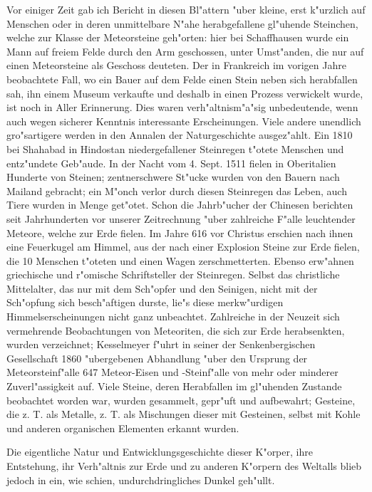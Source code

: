 \documentclass[a4paper, 11pt, oneside]{article}
\begin{document}
Vor einiger Zeit gab ich Bericht in diesen Bl"attern "uber kleine, erst k"urzlich auf Menschen oder in deren unmittelbare N"ahe herabgefallene gl"uhende Steinchen, welche zur Klasse der Meteorsteine geh"orten: hier bei Schaffhausen wurde ein Mann auf freiem Felde durch den Arm geschossen, unter Umst"anden, die nur auf einen Meteorsteine als Geschoss deuteten. Der in Frankreich im vorigen Jahre beobachtete Fall, wo ein Bauer auf dem Felde einen Stein neben sich herabfallen sah, ihn einem Museum verkaufte und deshalb in einen Prozess verwickelt wurde, ist noch in Aller Erinnerung. Dies waren verh"altnism"a"sig unbedeutende, wenn auch wegen sicherer Kenntnis interessante Erscheinungen. Viele andere unendlich gro"sartigere werden in den Annalen der Naturgeschichte ausgez"ahlt. Ein 1810 bei Shahabad in Hindostan niedergefallener Steinregen t"otete Menschen und entz"undete Geb"aude. In der Nacht vom 4. Sept. 1511 fielen in Oberitalien Hunderte von Steinen; zentnerschwere St"ucke wurden von den Bauern nach Mailand gebracht; ein M"onch verlor durch diesen Steinregen das Leben, auch Tiere wurden in Menge get"otet. Schon die Jahrb"ucher der Chinesen berichten seit Jahrhunderten vor unserer Zeitrechnung "uber zahlreiche F"alle leuchtender Meteore, welche zur Erde fielen. Im Jahre 616 vor Christus erschien nach ihnen eine Feuerkugel am Himmel, aus der nach einer Explosion Steine zur Erde fielen, die 10 Menschen t"oteten und einen Wagen zerschmetterten. Ebenso erw"ahnen griechische und r"omische Schriftsteller der Steinregen. Selbst das christliche Mittelalter, das nur mit dem Sch"opfer und den Seinigen, nicht mit der Sch"opfung sich besch"aftigen durste, lie"s diese merkw"urdigen Himmelserscheinungen nicht ganz unbeachtet. Zahlreiche in der Neuzeit sich vermehrende Beobachtungen von Meteoriten, die sich zur Erde herabsenkten, wurden verzeichnet; Kesselmeyer f"uhrt in seiner der Senkenbergischen Gesellschaft 1860 "ubergebenen Abhandlung "uber den Ursprung der Meteorsteinf"alle 647 Meteor-Eisen und -Steinf"alle von mehr oder minderer Zuverl"assigkeit auf. Viele Steine, deren Herabfallen im gl"uhenden Zustande beobachtet worden war, wurden gesammelt, gepr"uft und aufbewahrt; Gesteine, die z. T. als Metalle, z. T. als Mischungen dieser mit Gesteinen, selbst mit Kohle und anderen organischen Elementen erkannt wurden.

Die eigentliche Natur und Entwicklungsgeschichte dieser K"orper, ihre Entstehung, ihr Verh"altnis zur Erde und zu anderen K"orpern des Weltalls blieb jedoch in ein, wie schien, undurchdringliches Dunkel geh"ullt.
\end{document}
